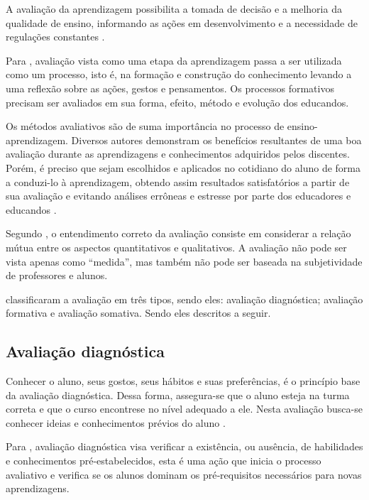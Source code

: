 \documentclass[
	12pt,				%
	openright,			%
	oneside,
	a4paper,			%
	english,			%
	french,				%
	spanish,			%
	brazil,				%
	]{abntex2}
\begin{document}
A avaliação da aprendizagem possibilita a tomada de decisão e a melhoria da qualidade de ensino, informando as ações em desenvolvimento e a necessidade de regulações constantes \cite{kraemer2005avaliaccao}.

Para , avaliação vista como uma etapa da aprendizagem passa a ser utilizada como um processo, isto é, na formação e construção do conhecimento levando a uma reflexão sobre as ações, gestos e pensamentos. Os processos formativos precisam ser avaliados em sua forma, efeito, método e evolução dos educandos.

Os métodos avaliativos são de suma importância no processo de ensino-aprendizagem. Diversos autores demonstram os benefícios resultantes de uma boa avaliação durante as aprendizagens e conhecimentos adquiridos pelos discentes. Porém, é preciso que sejam escolhidos e aplicados no cotidiano do aluno de forma a conduzi-lo à aprendizagem, obtendo assim resultados satisfatórios a partir de sua avaliação e evitando análises errôneas e estresse por parte dos educadores e educandos  \cite{da2014alunos}.

Segundo , o entendimento correto da avaliação consiste em considerar a relação mútua entre os aspectos quantitativos e qualitativos. A avaliação não pode ser vista apenas como ``medida'', mas também não pode ser baseada na subjetividade de professores e alunos.

 classificaram a avaliação em três tipos, sendo eles:
avaliação diagnóstica; avaliação formativa e avaliação somativa. Sendo eles descritos a seguir.

\subsection{Avaliação diagnóstica}
\label{sec:AvaDiag}
Conhecer o aluno, seus gostos, seus hábitos e suas preferências, é o princípio base da avaliação diagnóstica. Dessa forma, assegura-se que o aluno esteja na turma correta e que o curso encontrese no nível adequado a ele. Nesta avaliação busca-se conhecer ideias e conhecimentos prévios do aluno \cite{masetto1994didatica}.

Para , avaliação diagnóstica visa verificar a existência, ou ausência, de
habilidades e conhecimentos pré‐estabelecidos, esta é uma ação que inicia o
processo avaliativo e verifica se os alunos dominam os pré‐requisitos necessários
para novas aprendizagens.
\end{document}
